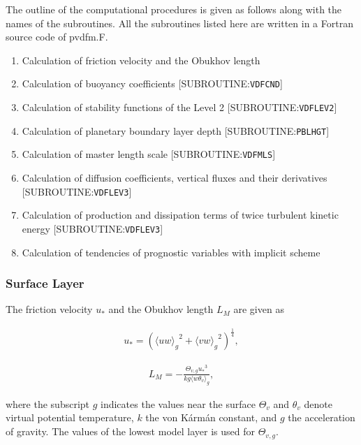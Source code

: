 The outline of the computational procedures is given as follows along with the names of the subroutines. All the subroutines listed here are written in a Fortran source code of pvdfm.F.

\begin{enumerate}
\def\labelenumi{\arabic{enumi}.}
\tightlist
\item
  Calculation of friction velocity and the Obukhov length
\item
  Calculation of buoyancy coefficients {[}SUBROUTINE:\texttt{VDFCND}{]}
\item
  Calculation of stability functions of the Level 2 {[}SUBROUTINE:\texttt{VDFLEV2}{]}
\item
  Calculation of planetary boundary layer depth {[}SUBROUTINE:\texttt{PBLHGT}{]}
\item
  Calculation of master length scale {[}SUBROUTINE:\texttt{VDFMLS}{]}
\item
  Calculation of diffusion coefficients, vertical fluxes and their derivatives {[}SUBROUTINE:\texttt{VDFLEV3}{]}
\item
  Calculation of production and dissipation terms of twice turbulent kinetic energy {[}SUBROUTINE:\texttt{VDFLEV3}{]}
\item
  Calculation of tendencies of prognostic variables with implicit scheme
\end{enumerate}

\hypertarget{surface-layer}{%
\subsubsection{Surface Layer}\label{surface-layer}}

The friction velocity \(u_*\) and the Obukhov length \(L_M\) are given as

\begin{eqnarray}u_*=\left({\langle uw \rangle_g}^2+{\langle vw \rangle_g}^2 \right)^\frac{1}{4},\end{eqnarray}

\begin{eqnarray}L_M=-\frac{\Theta_{v,g} {u_*}^3}{kg \langle w\theta_v \rangle_g},\end{eqnarray}

where the subscript \(g\) indicates the values near the surface \(\Theta_v\) and \(\theta_v\) denote virtual potential temperature, \(k\) the von Kármán constant, and \(g\) the acceleration of
gravity. The values of the lowest model layer is used for \(\Theta_{v,g}\).

